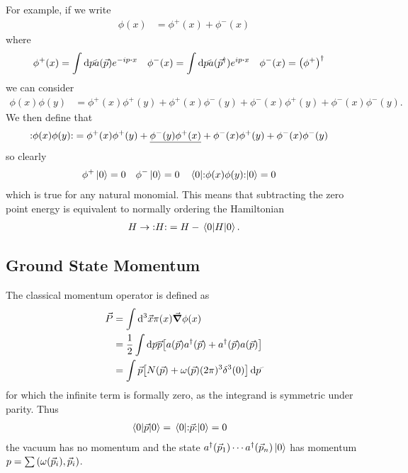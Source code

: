 \documentclass[notes.tex]{subfiles}
\begin{document}
For example, if we write 
\begin{align*}
    \phi(x) &= \phi^+(x) + \phi^-(x)
\end{align*}
where
\begin{align}
    \phi^+(x) &= \int \dds{p} a(\vec{p})e^{-ip\vdot{x}}&
    \phi^-(x) &= \int \dds{p} a(\vec{p}^\dagger)e^{ip\vdot{x}}&
    \phi^-(x) &= \qty(\phi^+)^\dagger
    \label{eqn:rqft_canonical-quantisation_creation-annihilation-fields}
\end{align}
we can consider
\begin{align*}
    \phi(x)\phi(y) &= \phi^+(x)\phi^+(y) + \phi^+(x)\phi^-(y) + \phi^-(x)\phi^+(y) + \phi^-(x)\phi^-(y).
\end{align*}
We then define that
\begin{align*}
    \mathbf{:}\phi(x)\phi(y)\mathbf{:} &= \phi^+(x)\phi^+(y) + \underline{\phi^-(y)\phi^+(x)} + \phi^-(x)\phi^+(y) + \phi^-(x)\phi^-(y)
\end{align*}
so clearly
\begin{align*}
    \phi^+\ket{0} &= 0 & \phi^-\ket{0} &= 0 & \mel{0}{\mathbf{:}\phi(x)\phi(y)\mathbf{:}}{0} &= 0
\end{align*} 
which is true for any natural monomial.
This means that subtracting the zero point energy is equivalent to normally ordering the Hamiltonian
\begin{align*}
    H \to \mathbf{:}H\mathbf{:} = H - \mel{0}{H}{0}.
\end{align*}

\subsection{Ground State Momentum}
The classical momentum operator is defined as
\begin{align*}
    \vec{P} &= \int \dd[3]\vec{x} \pi(x)\grad{\phi}(x)\\
    &= \half\int\dds{p} \vec{p} \qty[a(\vec{p})a^\dagger(\vec{p}) + a^\dagger(\vec{p}) a(\vec{p})]\\
    &= \int \vec{p}\qty[N(\vec{p}) + \omega(\vec{p})(2\pi)^3 \delta^3(0)] \,\dds{p} 
\end{align*}
for which the infinite term is formally zero, as the integrand is symmetric under parity. 
Thus
\begin{align*}
    \mel{0}{\vec{p}}{0} &= \mel{0}{\mathbf{:}\vec{p}\mathbf{:}}{0} = 0
\end{align*}
\ie{}the vacuum has no momentum and the state $a^\dagger(\vec{p}_1)\cdots a^\dagger(\vec{p}_n)\ket{0}$ has momentum $p = \sum\qty(\omega(\vec{p}_i), \vec{p}_i)$.
\end{document}
